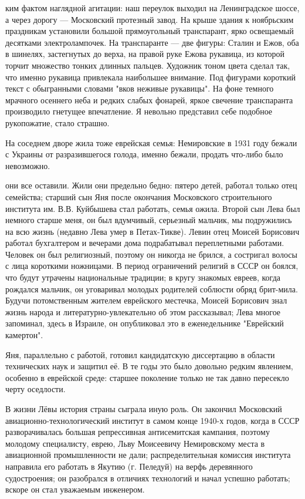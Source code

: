 ким фактом наглядной агитации: наш переулок выходил на Ленинградское шоссе, а через дорогу — Московский протезный завод. На крыше здания к ноябрьским праздникам установили большой прямоугольный транспарант, ярко освещаемый десятками электролампочек. На транспаранте — две фигуры: Сталин и Ежов, оба в шинелях, застегнутых до верха, на правой руке Ежова рукавица, из которой торчит множество тонких длинных пальцев. Художник тоном цвета сделал так, что именно рукавица привлекала наибольшее внимание. Под фигурами короткий текст с обыгранными словами "вков неживые рукавицы". На фоне темного мрачного осеннего неба и редких слабых фонарей, яркое свечение транспаранта производило гнетущее впечатление. Я невольно представил себе подобное рукопожатие, стало страшно.

На соседнем дворе жила тоже еврейская семья: Немировские в 1931 году бежали с Украины от разразившегося голода, именно бежали, продать что-либо было невозможно.

они все оставили. Жили они предельно бедно: пятеро детей, работал только отец семейства; старший сын Яня после окончания Московского строительного института им. В.В. Куйбышева стал работать, семья ожила. Второй сын Лева был немного старше меня, он был вдумчивый, серьезный мальчик, мы подружились на всю жизнь (недавно Лева умер в Петах-Тикве). Левин отец Моисей Борисович работал бухгалтером и вечерами дома подрабатывал переплетными работами. Человек он был религиозный, поэтому он никогда не брился, а состригал волосы с лица короткими ножницами. В период ограничений религий в СССР он боялся, что будут утрачены национальные традиции; в кругу знакомых евреев, когда рождался мальчик, он уговаривал молодых родителей соблюсти обряд брит-мила. Будучи потомственным жителем еврейского местечка, Моисей Борисович знал жизнь народа и литературно-увлекательно об этом рассказывал; Лева многое запоминал, здесь в Израиле, он опубликовал это в еженедельнике "Еврейский камертон".

Яня, параллельно с работой, готовил кандидатскую диссертацию в области технических наук и защитил её. В те годы это было довольно редким явлением, особенно в еврейской среде: старшее поколение только не так давно пересекло черту оседлости.

В жизни Лёвы история страны сыграла иную роль. Он закончил Московский авиационно-технологический институт в самом конце 1940-х годов, когда в СССР разворачивалась большая репрессивная антисемитская кампания, поэтому молодому специалисту, еврею, Льву Моисеевичу Немировскому места в авиационной промышленности не дали; распределительная комиссия института направила его работать в Якутию (г. Пеледуй) на верфь деревянного судостроения; он разобрался в отличиях технологий и начал успешно работать; вскоре он стал уважаемым инженером.


